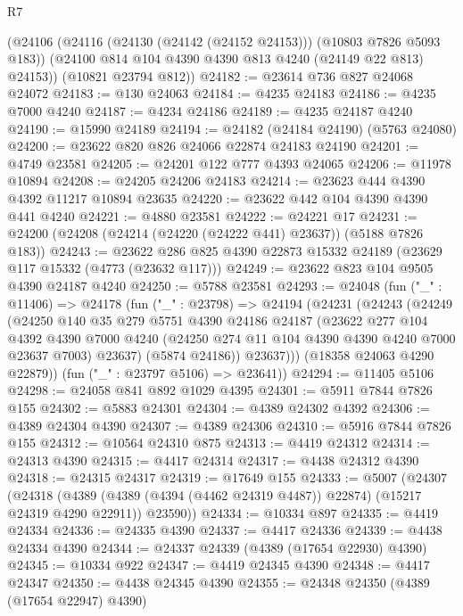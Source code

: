\begin{lexlean}{R7}
\begin{coremodule}
      (@24106
        (@24116 (@24130 (@24142 (@24152 @24153))) (@10803 @7826 @5093 @183))
        (@24100 @814 @104 @4390 @4390 @813 @4240 (@24149 @22 @813) @24153))
      (@10821 @23794 @812))
@24182 := @23614 @736 @827 @24068 @24072
@24183 := @130 @24063
@24184 := @4235 @24183
@24186 := @4235 @7000 @4240
@24187 := @4234 @24186
@24189 := @4235 @24187 @4240
@24190 := @15990 @24189
@24194 := @24182 (@24184 @24190) (@5763 @24080)
@24200 := @23622 @820 @826 @24066 @22874 @24183 @24190
@24201 := @4749 @23581
@24205 := @24201 @122 @777 @4393 @24065
@24206 := @11978 @10894
@24208 := @24205 @24206 @24183
@24214 := @23623 @444 @4390 @4392 @11217 @10894 @23635
@24220 := @23622 @442 @104 @4390 @4390 @441 @4240
@24221 := @4880 @23581
@24222 := @24221 @17
@24231 := @24200 (@24208 (@24214 (@24220 (@24222 @441) @23637)) (@5188 @7826 @183))
@24243 := @23622 @286 @825 @4390 @22873 @15332 @24189 (@23629 @117 @15332 (@4773 (@23632 @117)))
@24249 := @23622 @823 @104 @9505 @4390 @24187 @4240
@24250 := @5788 @23581
@24293 := @24048
    (fun ("_" : @11406) =>
    @24178
      (fun ("_" : @23798) =>
      @24194
        (@24231
          (@24243
            (@24249
              (@24250
                @140
                @35
                @279
                @5751
                @4390
                @24186
                @24187
                (@23622
                  @277
                  @104
                  @4392
                  @4390
                  @7000
                  @4240
                  (@24250 @274 @11 @104 @4390 @4390 @4240 @7000 @23637 @7003)
                  @23637)
                (@5874 @24186))
              @23637)))
        (@18358 @24063 @4290 @22879))
      (fun ("_" : @23797 @5106) => @23641))
@24294 := @11405 @5106
@24298 := @24058 @841 @892 @1029 @4395
@24301 := @5911 @7844 @7826 @155
@24302 := @5883 @24301
@24304 := @4389 @24302 @4392
@24306 := @4389 @24304 @4390
@24307 := @4389 @24306
@24310 := @5916 @7844 @7826 @155
@24312 := @10564 @24310 @875
@24313 := @4419 @24312
@24314 := @24313 @4390
@24315 := @4417 @24314
@24317 := @4438 @24312 @4390
@24318 := @24315 @24317
@24319 := @17649 @155
@24333 := @5007
    (@24307
      (@24318
        (@4389 (@4389 (@4394 (@4462 @24319 @4487)) @22874) (@15217 @24319 @4290 @22911))
        @23590))
@24334 := @10334 @897
@24335 := @4419 @24334
@24336 := @24335 @4390
@24337 := @4417 @24336
@24339 := @4438 @24334 @4390
@24344 := @24337 @24339 (@4389 (@17654 @22930) @4390)
@24345 := @10334 @922
@24347 := @4419 @24345 @4390
@24348 := @4417 @24347
@24350 := @4438 @24345 @4390
@24355 := @24348 @24350 (@4389 (@17654 @22947) @4390)

\end{coremodule}
\end{lexlean}
